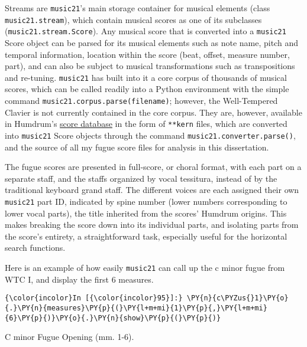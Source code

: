 Streams are \texttt{music21}'s main storage container for musical
elements (class \texttt{music21.stream}), which contain musical scores
as one of its subclasses (\texttt{music21.stream.Score}). Any musical
score that is converted into a \texttt{music21} Score object can be
parsed for its musical elements such as note name, pitch and temporal
information, location within the score (beat, offset, measure number,
part), and can also be subject to musical transformations such as
transpositions and re-tuning. \texttt{music21} has built into it a core
corpus of thousands of musical scores, which can be called readily into
a Python environment with the simple command
\texttt{music21.corpus.parse(\textquotesingle{}filename\textquotesingle{})};
however, the Well-Tempered Clavier is not currently contained in the
core corpus. They are, however, available in Humdrum's
\href{http://kern.ccarh.org/}{score database} in the form of
\texttt{**kern} files, which are converted into \texttt{music21} Score
objects through the command \texttt{music21.converter.parse()}, and the
source of all my fugue score files for analysis in this dissertation.

The fugue scores are presented in full-score, or choral format, with
each part on a separate staff, and the staffs organized by vocal
tessitura, instead of by the traditional keyboard grand staff. The
different voices are each assigned their own \texttt{music21} part ID,
indicated by spine number (lower numbers corresponding to lower vocal
parts), the title inherited from the scores' Humdrum origins. This makes
breaking the score down into its individual parts, and isolating parts
from the score's entirety, a straightforward task, especially useful for
the horizontal search functions.

Here is an example of how easily \texttt{music21} can call up the c
minor fugue from WTC I, and display the first 6 measures.


    \begin{Verbatim}[commandchars=\\\{\}]
{\color{incolor}In [{\color{incolor}95}]:} \PY{n}{c\PYZus{}1}\PY{o}{.}\PY{n}{measures}\PY{p}{(}\PY{l+m+mi}{1}\PY{p}{,}\PY{l+m+mi}{6}\PY{p}{)}\PY{o}{.}\PY{n}{show}\PY{p}{(}\PY{p}{)}
\end{Verbatim}

\begin{Example}[H]
    \begin{center}
    \caption{ C minor Fugue Opening (mm. 1-6). }
    \end{center}
\end{Example}
    
